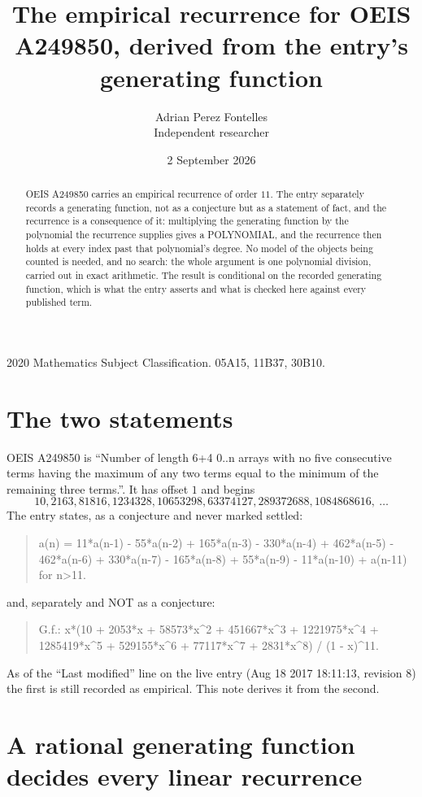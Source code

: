 \documentclass[11pt,a4paper]{article}
\title{The empirical recurrence for OEIS A249850, derived from the entry's generating function}
\author{Adrian Perez Fontelles\\ \small Independent researcher}
\date{2 September 2026}
\theoremstyle{plain}
\theoremstyle{definition}
\begin{document}
\maketitle

\begin{abstract}
OEIS A249850 carries an empirical recurrence of order $11$. The entry separately records a
generating function, not as a conjecture but as a statement of fact, and the recurrence is a
consequence of it: multiplying the generating function by the polynomial the recurrence
supplies gives a POLYNOMIAL, and the recurrence then holds at every index past that
polynomial's degree. No model of the objects being counted is needed, and no search: the
whole argument is one polynomial division, carried out in exact arithmetic. The result is
conditional on the recorded generating function, which is what the entry asserts and what is
checked here against every published term.
\end{abstract}

\noindent\small 2020 Mathematics Subject Classification. 05A15, 11B37, 30B10.\normalsize

\section{The two statements}

OEIS A249850 is ``Number of length 6+4 0..n arrays with no five consecutive terms having the maximum of any two terms equal to the minimum of the remaining three terms.''. It has offset $1$ and begins
\[
10, 2163, 81816, 1234328, 10653298, 63374127, 289372688, 1084868616,\ \dots
\]
The entry states, as a conjecture and never marked settled:
\begin{quote}
a(n) = 11*a(n-1) - 55*a(n-2) + 165*a(n-3) - 330*a(n-4) + 462*a(n-5) - 462*a(n-6) + 330*a(n-7) - 165*a(n-8) + 55*a(n-9) - 11*a(n-10) + a(n-11) for n>11.
\end{quote}
and, separately and NOT as a conjecture:
\begin{quote}
G.f.: x*(10 + 2053*x + 58573*x\^{}2 + 451667*x\^{}3 + 1221975*x\^{}4 + 1285419*x\^{}5 + 529155*x\^{}6 + 77117*x\^{}7 + 2831*x\^{}8) / (1 - x)\^{}11.
\end{quote}
As of the ``Last modified'' line on the live entry (Aug 18 2017 18:11:13, revision 8) the first is still
recorded as empirical. This note derives it from the second.

\section{A rational generating function decides every linear recurrence}
\end{document}
